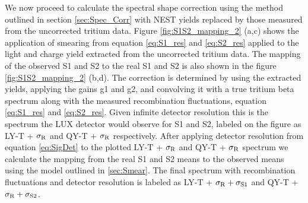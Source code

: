 We now proceed to calculate the spectral shape correction using the method outlined in section \ref{sec:Spec_Corr} with NEST yields replaced by those measured from the uncorrected tritium data. Figure \ref{fig:S1S2_mapping_2} (a,c) shows the application of smearing from equation \ref{eq:S1_res} and \ref{eq:S2_res} applied to the light and charge yield extracted from the uncorrected tritium data. The mapping of the observed S1 and S2 to the real S1 and S2 is also shown in the figure \ref{fig:S1S2_mapping_2} (b,d). The correction is determined by using the extracted yields, applying the gains g1 and g2, and convolving it with a true tritium beta spectrum along with the measured recombination fluctuations, equation \ref{eq:S1_res} and \ref{eq:S2_res}. Given infinite detector resolution this is the spectrum the LUX detector would observe for S1 and S2, labeled on the figure as LY-T + $\rm \sigma_R$ and QY-T + $\rm \sigma_R$ respectively. After applying detector resolution from equation \ref{eq:SigDet} to the plotted LY-T + $\rm \sigma_R$ and QY-T + $\rm \sigma_R$ spectrum we calculate the mapping from the real S1 and S2 means to the observed means using the model outlined in \ref{sec:Smear}. The final spectrum with recombination fluctuations and detector resolution is labeled as LY-T + $\rm \sigma_R + \sigma_{S1}$ and QY-T + $\rm \sigma_R + \sigma_{S2}$.


